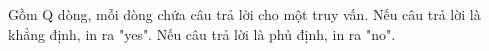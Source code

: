 Gồm Q dòng, mỗi dòng chứa câu trả lời cho một truy vấn. Nếu câu trả lời là khẳng định, in ra "yes". Nếu câu trả lời là phủ định, in ra "no".  

\